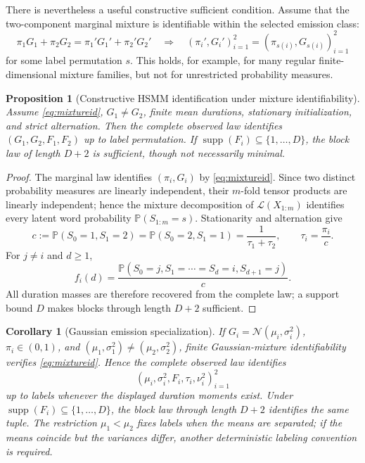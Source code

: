 \documentclass[11pt]{article}
\newtheorem{proposition}[theorem]{Proposition}
\newtheorem{corollary}[theorem]{Corollary}
\theoremstyle{definition}
\theoremstyle{remark}
\newcommand{\Pp}{\mathbb P}
\newcommand{\cL}{\mathcal L}
\begin{document}
There is nevertheless a useful constructive sufficient condition.  Assume
that the two-component marginal mixture is identifiable within the selected
emission class:
\begin{equation}
 \pi_1G_1+\pi_2G_2=\pi_1'G_1'+\pi_2'G_2'
 \quad\Longrightarrow\quad
 (\pi_i',G_i')_{i=1}^2=(\pi_{s(i)},G_{s(i)})_{i=1}^2
 \label{eq:mixtureid}
\end{equation}
for some label permutation $s$.  This holds, for example, for many regular
finite-dimensional mixture families, but not for unrestricted probability
measures.

\begin{proposition}[Constructive HSMM identification under mixture
identifiability]
Assume \eqref{eq:mixtureid}, $G_1\ne G_2$, finite mean durations, stationary
initialization, and strict alternation.  Then the complete observed law
identifies $(G_1,G_2,F_1,F_2)$ up to label permutation.  If
$\operatorname{supp}(F_i)\subseteq\{1,\ldots,D\}$, the block law of length
$D+2$ is sufficient, though not necessarily minimal.
\end{proposition}

\begin{proof}
The marginal law identifies $(\pi_i,G_i)$ by \eqref{eq:mixtureid}.  Since two
distinct probability measures are linearly independent, their $m$-fold
tensor products are linearly independent; hence the mixture decomposition of
$\cL(X_{1:m})$ identifies every latent word probability
$\Pp(S_{1:m}=s)$.  Stationarity and alternation give
\[
 c:=\Pp(S_0=1,S_1=2)=\Pp(S_0=2,S_1=1)
   =\frac1{\tau_1+\tau_2},
 \qquad \tau_i=\frac{\pi_i}{c}.
\]
For $j\ne i$ and $d\ge1$,
\[
 f_i(d)=\frac{
 \Pp(S_0=j,S_1=\cdots=S_d=i,S_{d+1}=j)}{c}.
\]
All duration masses are therefore recovered from the complete law; a support
bound $D$ makes blocks through length $D+2$ sufficient.
\end{proof}

\begin{corollary}[Gaussian emission specialization]
If $G_i=\mathcal N(\mu_i,\sigma_i^2)$, $\pi_i\in(0,1)$, and
$(\mu_1,\sigma_1^2)\ne(\mu_2,\sigma_2^2)$, finite Gaussian-mixture
identifiability \cite{Teicher1963} verifies \eqref{eq:mixtureid}.  Hence the
complete observed law identifies
\[
 (\mu_i,\sigma_i^2,F_i,\tau_i,\nu_i^2)_{i=1}^2
\]
up to labels whenever the displayed duration moments exist.  Under
$\operatorname{supp}(F_i)\subseteq\{1,\ldots,D\}$, the block law through
length $D+2$ identifies the same tuple.  The restriction $\mu_1<\mu_2$
fixes labels when the means are separated; if the means coincide but the
variances differ, another deterministic labeling convention is required.
\end{corollary}
\end{document}
